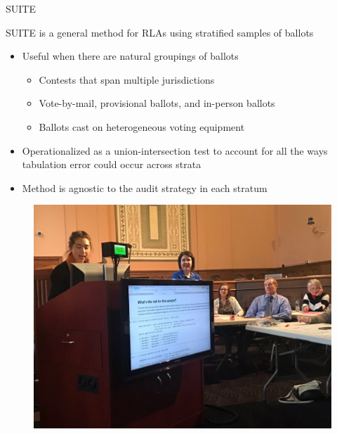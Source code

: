 \documentclass[final]{beamer}
\newlength{\onecolwid}
\begin{document}
\begin{frame}[t]
\begin{columns}[t]
\begin{column}{\onecolwid}
\begin{block}{SUITE}

SUITE is a general method for RLAs using stratified samples of ballots \cite{ottoboni2018risk}

\begin{itemize}
\item Useful when there are natural groupings of ballots\begin{itemize}
\item Contests that span multiple jurisdictions
\item Vote-by-mail, provisional ballots, and in-person ballots
\item Ballots cast on heterogeneous voting equipment
\end{itemize}


\item Operationalized as a union-intersection test to account for all the ways tabulation error could occur across strata
\item Method is agnostic to the audit strategy in each stratum
\end{itemize}


\end{block}


\begin{figure}
\includegraphics[width=0.9\linewidth]{../photo/notebook}
\end{figure}






\end{column} %


\end{columns}
\end{frame}
\end{document}
